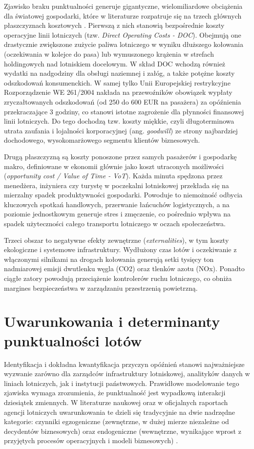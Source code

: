Zjawisko braku punktualności generuje gigantyczne, wielomiliardowe obciążenia dla światowej gospodarki, które w literaturze rozpatruje się na trzech głównych płaszczyznach kosztowych \cite{doganis}. Pierwszą z nich stanowią bezpośrednie koszty operacyjne linii lotniczych (tzw. \textit{Direct Operating Costs - DOC}). Obejmują one drastycznie zwiększone zużycie paliwa lotniczego w wyniku dłuższego kołowania (oczekiwania w kolejce do pasa) lub wymuszonego krążenia w strefach holdingowych nad lotniskiem docelowym. W skład DOC wchodzą również wydatki na nadgodziny dla obsługi naziemnej i załóg, a także potężne koszty odszkodowań konsumenckich. W samej tylko Unii Europejskiej restrykcyjne Rozporządzenie WE 261/2004 nakłada na przewoźników obowiązek wypłaty zryczałtowanych odszkodowań (od 250 do 600 EUR na pasażera) za opóźnienia przekraczające 3 godziny, co stanowi istotne zagrożenie dla płynności finansowej linii lotniczych. Do tego dochodzą tzw. koszty miękkie, czyli długoterminowa utrata zaufania i lojalności korporacyjnej (ang. \textit{goodwill}) ze strony najbardziej dochodowego, wysokomarżowego segmentu klientów biznesowych.

Drugą płaszczyzną są koszty ponoszone przez samych pasażerów i gospodarkę makro, definiowane w ekonomii głównie jako koszt utraconych możliwości (\textit{opportunity cost / Value of Time - VoT}). Każda minuta spędzona przez menedżera, inżyniera czy turystę w poczekalni lotniskowej przekłada się na mierzalny spadek produktywności gospodarki. Powoduje to niemożność odbycia kluczowych spotkań handlowych, przerwanie łańcuchów logistycznych, a na poziomie jednostkowym generuje stres i zmęczenie, co pośrednio wpływa na spadek użyteczności całego transportu lotniczego w oczach społeczeństwa.

Trzeci obszar to negatywne efekty zewnętrzne (\textit{externalities}), w tym koszty ekologiczne i systemowe infrastruktury. Wydłużony czas lotów i oczekiwanie z włączonymi silnikami na drogach kołowania generują setki tysięcy ton nadmiarowej emisji dwutlenku węgla (CO2) oraz tlenków azotu (NOx). Ponadto ciągłe zatory powodują przeciążenie kontrolerów ruchu lotniczego, co obniża margines bezpieczeństwa w zarządzaniu przestrzenią powietrzną.

\section{Uwarunkowania i determinanty punktualności lotów}

Identyfikacja i dokładna kwantyfikacja przyczyn opóźnień stanowi najważniejsze wyzwanie zarówno dla zarządców infrastruktury lotniskowej, analityków danych w liniach lotniczych, jak i instytucji państwowych. Prawidłowe modelowanie tego zjawiska wymaga zrozumienia, że punktualność jest wypadkową interakcji dziesiątek zmiennych. W literaturze naukowej oraz w oficjalnych raportach agencji lotniczych uwarunkowania te dzieli się tradycyjnie na dwie nadrzędne kategorie: czynniki egzogeniczne (zewnętrzne, w dużej mierze niezależne od decydentów biznesowych) oraz endogeniczne (wewnętrzne, wynikające wprost z przyjętych procesów operacyjnych i modeli biznesowych) \cite{iata_delay_codes}.

